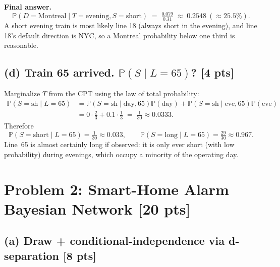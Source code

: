 \documentclass[12pt]{article}
\newcommand{\Prb}{\mathbb{P}}
\begin{document}
\textbf{Final answer.}
\[
  \Prb(D=\text{Montreal}\mid T=\text{evening},S=\text{short}) \;=\; \tfrac{0.079}{0.31}\;\approx\;0.2548\ (\approx 25.5\%).
\]
A short evening train is most likely line 18 (always short in the evening), and line 18's default direction is NYC, so a Montreal probability below one third is reasonable.

\subsection*{(d) Train 65 arrived. $\Prb(S\mid L=65)$? [4 pts]}

Marginalize $T$ from the CPT using the law of total probability:
\begin{align*}
  \Prb(S=\text{sh}\mid L=65)
  &= \Prb(S=\text{sh}\mid \text{day},65)\Prb(\text{day}) + \Prb(S=\text{sh}\mid \text{eve},65)\Prb(\text{eve})\\
  &= 0\cdot\tfrac{2}{3} + 0.1\cdot\tfrac{1}{3} \;=\; \tfrac{1}{30}\approx 0.0333.
\end{align*}
Therefore
\[
  \Prb(S=\text{short}\mid L=65)=\tfrac{1}{30}\approx 0.033,\qquad
  \Prb(S=\text{long}\mid L=65)=\tfrac{29}{30}\approx 0.967.
\]
Line~65 is almost certainly long if observed: it is only ever short (with low probability) during evenings, which occupy a minority of the operating day.

\section*{Problem 2: Smart-Home Alarm Bayesian Network \hfill [20 pts]}

\subsection*{(a) Draw + conditional-independence via d-separation [8 pts]}

\begin{center}
\end{center}
\end{document}

